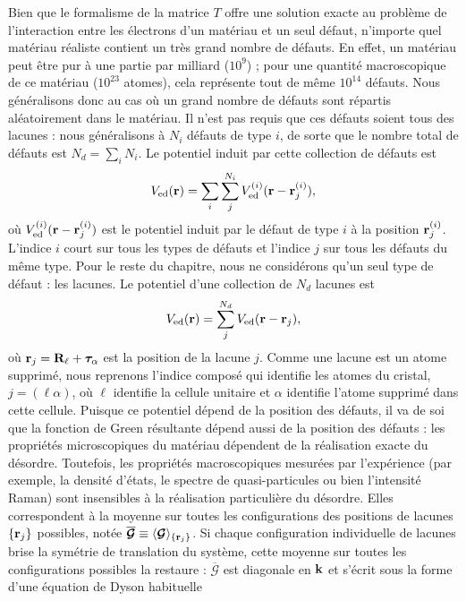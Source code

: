 Bien que le formalisme de la matrice $T$ offre une solution exacte au problème de l'interaction entre les électrons d'un matériau et un seul défaut, n'importe quel matériau réaliste contient un très grand nombre de défauts. En effet, un matériau peut être pur à une partie par milliard ($10^9$) ; pour une quantité macroscopique de ce matériau ($10^{23}$ atomes), cela représente tout de même $10^{14}$ défauts. Nous généralisons donc au cas où un grand nombre de défauts sont répartis aléatoirement dans le matériau. Il n'est pas requis que ces défauts soient tous des lacunes : nous généralisons à $N_i$ défauts de type $i$, de sorte que le nombre total de défauts est $N_d=\sum_i N_i$. Le potentiel induit par cette collection de défauts est
\begin{equation}
    V_\text{ed}(\mathbf{r}) = \sum_i \sum_j^{N_i} V_\text{ed}^{(i)}(\mathbf{r}-\mathbf{r}_j^{(i)}),
\end{equation}
où $V_\text{ed}^{(i)}(\mathbf{r}-\mathbf{r}_j^{(i)})$ est le potentiel induit par le défaut de type $i$ à la position $\mathbf{r}_j^{(i)}$. L'indice $i$ court sur tous les types de défauts et l'indice $j$ sur tous les défauts du même type. Pour le reste du chapitre, nous ne considérons qu'un seul type de défaut : les lacunes. Le potentiel d'une collection de $N_d$ lacunes est
\begin{equation}
    V_\text{ed}(\mathbf{r}) = \sum_j^{N_d}V_\text{ed}(\mathbf{r}-\mathbf{r}_j),
\end{equation}
où $\mathbf{r}_j=\mathbf{R}_\ell+\bm\tau_\alpha$ est la position de la lacune $j$. Comme une lacune est un atome supprimé, nous reprenons l'indice composé qui identifie les atomes du cristal, $j=(\ell\alpha)$, où $\ell$ identifie la cellule unitaire et $\alpha$ identifie l'atome supprimé dans cette cellule. Puisque ce potentiel dépend de la position des défauts, il va de soi que la fonction de Green résultante dépend aussi de la position des défauts : les propriétés microscopiques du matériau dépendent de la réalisation exacte du désordre. Toutefois, les propriétés macroscopiques mesurées par l'expérience (par exemple, la densité d'états, le spectre de quasi-particules ou bien l'intensité Raman) sont insensibles à la réalisation particulière du désordre. Elles correspondent à la moyenne sur toutes les configurations des positions de lacunes $\{\mathbf{r}_j\}$ possibles, notée $\overline{\bm{\mathcal{G}}}\equiv\langle\bm{\mathcal{G}}\rangle_{\{\mathbf{r}_j\}}$. Si chaque configuration individuelle de lacunes brise la symétrie de translation du système, cette moyenne sur toutes les configurations possibles la restaure : $\overline{\bm{\mathcal{G}}}$ est diagonale en $\mathbf{k}$ et s'écrit sous la forme d'une équation de Dyson habituelle~\cite{mahanManyParticlePhysics2000}
